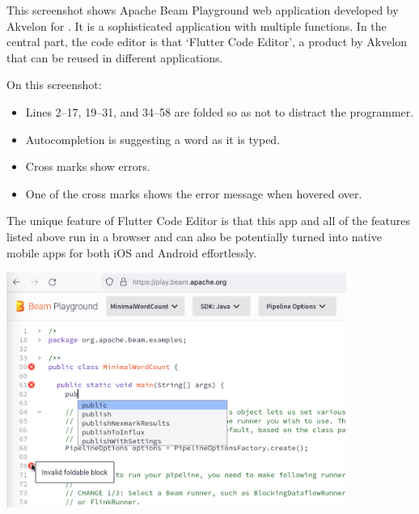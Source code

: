 
This screenshot shows Apache Beam Playground web application developed by Akvelon
for \Asf.
It is a sophisticated application with multiple functions.
In the central part, the code editor is that `Flutter Code Editor',
a product by Akvelon that can be reused in different applications.

On this screenshot:

\begin{itemize}
    \item Lines 2--17, 19--31, and 34--58 are folded so as not to distract the programmer.
    \item Autocompletion is suggesting a word as it is typed.
    \item Cross marks show errors.
    \item One of the cross marks shows the error message when hovered over.
\end{itemize}

The unique feature of Flutter Code Editor is that this app and all of the features listed above run in a browser
and can also be potentially turned into native mobile apps for both iOS and Android effortlessly.

\begin{center}
    \includegraphics[width=30em]{demo}
\end{center}

\pagebreak
